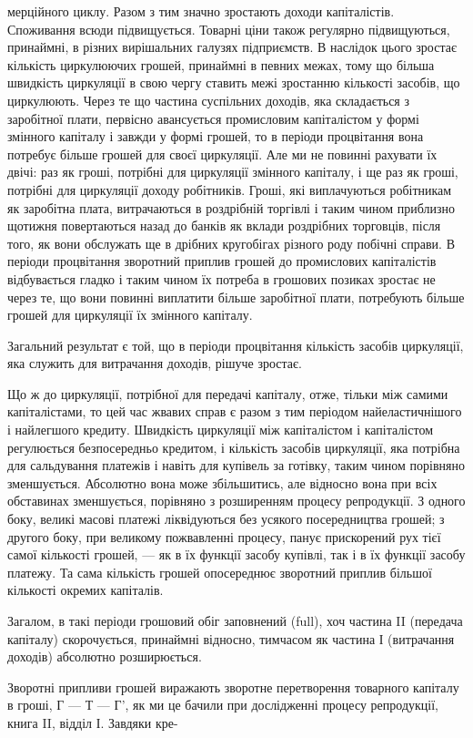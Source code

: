 мерційного циклу. Разом з тим значно зростають доходи капіталістів. Споживання всюди підвищується.
Товарні ціни також
регулярно підвищуються, принаймні, в різних вирішальних галузях підприємств. В наслідок цього
зростає кількість циркулюючих грошей, принаймні в певних межах, тому що більша
швидкість циркуляції в свою чергу ставить межі зростанню кількості засобів, що циркулюють. Через те
що частина суспільних
доходів, яка складається з заробітної плати, первісно авансується промисловим капіталістом у формі
змінного капіталу
і завжди у формі грошей, то в періоди процвітання вона потребує більше грошей для своєї циркуляції.
Але ми не повинні
рахувати їх двічі: раз як гроші, потрібні для циркуляції змінного капіталу, і ще раз як гроші,
потрібні для циркуляції доходу робітників. Гроші, які виплачуються робітникам як заробітна плата,
витрачаються в роздрібній торгівлі і таким чином
приблизно щотижня повертаються назад до банків як вклади роздрібних торговців, після того, як вони
обслужать ще в дрібних
кругобігах різного роду побічні справи. В періоди процвітання
зворотний приплив грошей до промислових капіталістів відбувається гладко і таким чином їх потреба в
грошових позиках
зростає не через те, що вони повинні виплатити більше заробітної плати, потребують більше грошей для
циркуляції їх змінного капіталу.

Загальний результат є той, що в періоди процвітання кількість засобів циркуляції, яка служить для
витрачання доходів,
рішуче зростає.

Що ж до циркуляції, потрібної для передачі капіталу, отже,
тільки між самими капіталістами, то цей час жвавих справ
є разом з тим періодом найеластичнішого і найлегшого кредиту. Швидкість циркуляції між капіталістом
і капіталістом
регулюється безпосередньо кредитом, і кількість засобів циркуляції, яка потрібна для сальдування
платежів і навіть для купівель за готівку, таким чином порівняно зменшується. Абсолютно
вона може збільшитись, але відносно вона при всіх обставинах зменшується, порівняно з розширенням
процесу репродукції. З одного боку, великі масові платежі ліквідуються без усякого посередництва
грошей; з другого боку, при великому пожвавленні процесу, панує прискорений рух тієї самої кількості
грошей, — як в їх функції засобу купівлі, так і в їх функції засобу платежу. Та сама кількість
грошей опосереднює зворотний
приплив більшої кількості окремих капіталів.

Загалом, в такі періоди грошовий обіг заповнений (full),
хоч частина II (передача капіталу) скорочується, принаймні
відносно, тимчасом як частина І (витрачання доходів) абсолютно
розширюється.

Зворотні припливи грошей виражають зворотне перетворення
товарного капіталу в гроші, Г — Т — Г', як ми це бачили при
дослідженні процесу репродукції, книга II, відділ І. Завдяки кре-
